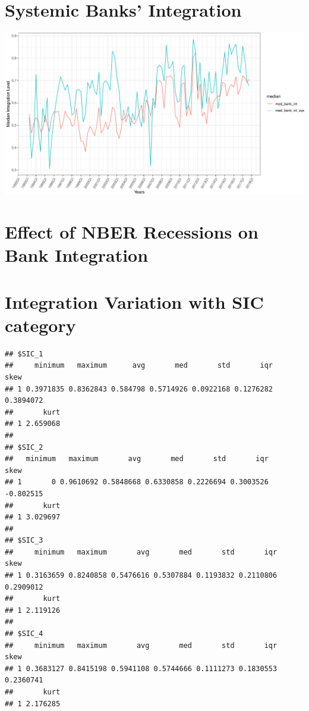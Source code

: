 \documentclass[11pt,]{article}
\begin{document}
\section{Systemic Banks' Integration}\label{systemic-banks-integration}

\begin{center}\includegraphics{AC_US_Bank_Int_Results_1_files/figure-latex/systemic-1} \end{center}

\section{Effect of NBER Recessions on Bank
Integration}\label{effect-of-nber-recessions-on-bank-integration}

\section{Integration Variation with SIC
category}\label{integration-variation-with-sic-category}

\begin{verbatim}
## $SIC_1
##     minimum   maximum      avg       med       std       iqr      skew
## 1 0.3971835 0.8362843 0.584798 0.5714926 0.0922168 0.1276282 0.3894072
##       kurt
## 1 2.659068
## 
## $SIC_2
##   minimum   maximum       avg       med       std       iqr      skew
## 1       0 0.9610692 0.5848668 0.6330858 0.2226694 0.3003526 -0.802515
##       kurt
## 1 3.029697
## 
## $SIC_3
##     minimum   maximum       avg       med       std       iqr      skew
## 1 0.3163659 0.8240858 0.5476616 0.5307884 0.1193832 0.2110806 0.2909012
##       kurt
## 1 2.119126
## 
## $SIC_4
##     minimum   maximum       avg       med       std       iqr      skew
## 1 0.3683127 0.8415198 0.5941108 0.5744666 0.1111273 0.1830553 0.2360741
##       kurt
## 1 2.176285
\end{verbatim}
\end{document}
